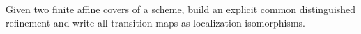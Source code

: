\begin{problem}\label{chal:vi20-03}
Given two finite affine covers of a scheme, build an explicit common distinguished refinement and write all transition maps as localization isomorphisms.
\end{problem}

